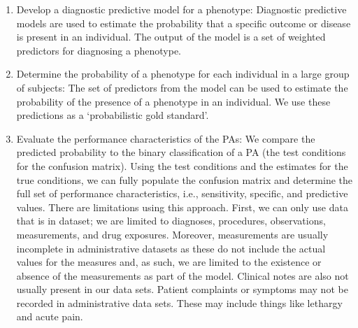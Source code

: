 \documentclass[11pt]{book}
\theoremstyle{definition}
\theoremstyle{definition}
\theoremstyle{definition}
\theoremstyle{remark}
\begin{document}
\begin{enumerate}
\def\labelenumi{\arabic{enumi})}
\item
  Develop a diagnostic predictive model for a phenotype: Diagnostic predictive models are used to estimate the probability that a specific outcome or disease is present in an individual.\citep{moons_transparent_2015} The output of the model is a set of weighted predictors for diagnosing a phenotype.
\item
  Determine the probability of a phenotype for each individual in a large group of subjects: The set of predictors from the model can be used to estimate the probability of the presence of a phenotype in an individual. We use these predictions as a `probabilistic gold standard'.
\item
  Evaluate the performance characteristics of the PAs: We compare the predicted probability to the binary classification of a PA (the test conditions for the confusion matrix). Using the test conditions and the estimates for the true conditions, we can fully populate the confusion matrix and determine the full set of performance characteristics, i.e., sensitivity, specific, and predictive values.
  There are limitations using this approach. First, we can only use data that is in dataset; we are limited to diagnoses, procedures, observations, measurements, and drug exposures. Moreover, measurements are usually incomplete in administrative datasets as these do not include the actual values for the measures and, as such, we are limited to the existence or absence of the measurements as part of the model. Clinical notes are also not usually present in our data sets. Patient complaints or symptoms may not be recorded in administrative data sets. These may include things like lethargy and acute pain.

\end{enumerate}
\end{document}
